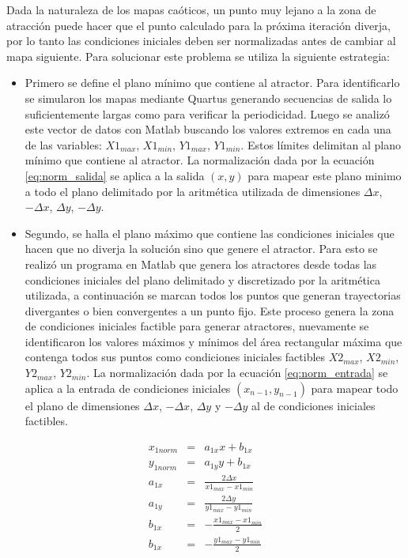 Dada la naturaleza de los mapas caóticos, un punto muy lejano a la zona de atracción puede hacer que el punto calculado para la próxima iteración diverja, por lo tanto las condiciones iniciales deben ser normalizadas antes de cambiar al mapa siguiente.
Para solucionar este problema se utiliza la siguiente estrategia:
\begin{itemize}
	\item Primero se define el plano mínimo que contiene al atractor.
	Para identificarlo se simularon los mapas mediante Quartus generando secuencias de salida lo suficientemente largas como para verificar la periodicidad.
	Luego se analizó este vector de datos con Matlab buscando los valores extremos en cada una de las variables: $X1_{max}$, $X1_{min}$, $Y1_{max}$, $Y1_{min}$.
	Estos límites delimitan al plano mínimo que contiene al atractor.
	La normalización dada por la ecuación \ref{eq:norm_salida} se aplica a la salida $\left(x,y\right)$ para mapear este plano minimo a todo el plano delimitado por la aritmética utilizada de dimensiones $\Delta x$, $-\Delta x$, $\Delta y$, $-\Delta y$.
	\item Segundo, se halla el plano máximo que contiene las condiciones iniciales que hacen que no diverja la solución sino que genere el atractor.
	Para esto se realizó un programa en Matlab que genera los atractores desde todas las condiciones iniciales del plano delimitado y discretizado por la aritmética utilizada, a continuación se marcan todos los puntos que generan trayectorias divergantes o bien convergentes a un punto fijo. 
	Este proceso genera la zona de condiciones iniciales factible para generar atractores, nuevamente se identificaron los valores máximos y mínimos del área rectangular máxima que contenga todos sus puntos como condiciones iniciales factibles $X2_{max}$, $X2_{min}$, $Y2_{max}$, $Y2_{min}$. 
	La normalización dada por la ecuación \ref{eq:norm_entrada} se aplica a la entrada de condiciones iniciales $\left(x_{n-1},y_{n-1}\right)$ para mapear todo el plano de dimensiones $\Delta x$, $-\Delta x$, $\Delta y$ y $-\Delta y$ al de condiciones iniciales factibles.
\end{itemize}
%
\begin{eqnarray}\label{eq:norm_salida}
x_{1norm}&=& a_{1x} x+b_{1x} \nonumber\\
y_{1norm}&=& a_{1y} y+b_{1x} \nonumber\\
a_{1x}&=& \frac{2\Delta x}{x1_{max}-x1_{min}} \nonumber\\
a_{1y}&=& \frac{2\Delta y}{y1_{max}-y1_{min}} \nonumber\\
b_{1x}&=& -\frac{x1_{max}-x1_{min}}{2} \nonumber\\
b_{1x}&=& -\frac{y1_{max}-y1_{min}}{2}
\end{eqnarray}
